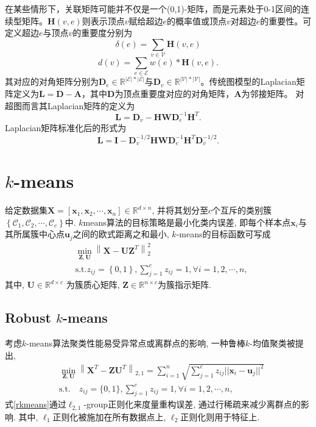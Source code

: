 \documentclass[lang=cn,10pt]{gorgeousnbook}
\numberwithin{equation}{section}%
\numberwithin{figure}{section}%
\begin{document}
在某些情形下，关联矩阵可能并不仅是一个(0,1)-矩阵，而是元素处于0-1区间的连续型矩阵。$\mathbf{H}(v,e)$则表示顶点$v$赋给超边$e$的概率值或顶点$v$对超边$e$的重要性。可定义超边$e$与顶点$v$的重要度分别为
\begin{equation}
\delta(e)=\sum_{v\in\mathcal{V}}\mathbf{H}(v,e)
\end{equation}
\begin{equation}
d(v)=\sum_{e\in\mathcal{E}}w(e)*\mathbf{H}(v,e).
\end{equation}
其对应的对角矩阵分别为$\mathbf{D}_e\in\mathbb{R}^{|\mathcal{E}|*|\mathcal{E}|}$与$\mathbf{D}_v\in\mathbb{R}^{|\mathcal{V}|*|\mathcal{V}|}$。传统图模型的Laplacian矩阵定义为$\mathbf{L} = \mathbf{D}-\mathbf{A}$，其中$\mathbf{D}$为顶点重要度对应的对角矩阵，$\mathbf{A}$为邻接矩阵。
对超图而言其Laplacian矩阵的定义为
\begin{equation}
\mathbf{L}=\mathbf{D}_v-\mathbf{H}\mathbf{W}\mathbf{D}_e^{-1}\mathbf{H}^T.
\end{equation}
Laplacian矩阵标准化后的形式为
\begin{equation}
\mathbf{L}=\mathbf{I}-\mathbf{D}_v^{-1/2}\mathbf{H}\mathbf{W}\mathbf{D}_e^{-1}\mathbf{H}^T\mathbf{D}_v^{-1/2}.
\end{equation}




\section{$k$-means}
给定数据集$\bm{X} = [\bm{x}_1,\bm{x}_2,\cdots,\bm{x}_n]\in\mathbb{R}^{d\times n}$, 并将其划分至$c$个互斥的类别簇$\left\{\mathcal{C}_1,\mathcal{C}_2,\cdots,\mathcal{C}_c\right\}$中. $k$means算法的目标策略是最小化类内误差, 即每个样本点$\bm{x}_i$与其所属簇中心点$\bm{u}_j$之间的欧式距离之和最小, $k$-means的目标函数可写成
\begin{equation}
\begin{aligned}
&\min_{\boldsymbol{Z},\boldsymbol{U}} \left\| \boldsymbol{X}-\boldsymbol{UZ}^T \right\| _{2}^{2}\\
&\mathrm{s}.\mathrm{t}. z_{ij}=\left\{ 0,1 \right\} ,\sum_{j=1}^c{z_{ij}=1,\forall i=1,2,\cdots ,n,}
\end{aligned}
\end{equation}
其中, $\bm{U}\in\mathbb{R}^{d\times c}$ 为簇质心矩阵, $\bm{Z}\in\mathbb{R}^{n\times c}$为簇指示矩阵. 
\subsection{Robust $k$-means}
考虑$k$-means算法聚类性能易受异常点或离群点的影响, 一种鲁棒$k$-均值聚类被提出,
\begin{equation}
\begin{aligned}
&\min_{\bm{Z},\bm{U}}\left\|\bm{X}^T-\bm{ZU}^T\right\|_{2,1}=\sum_{i=1}^n\sqrt{\sum_{j=1}^cz_{ij}||\boldsymbol{x}_i-\boldsymbol{u}_j||^2}\\
&\text{s.t.}\quad z_{ij}=\{0,1\},\sum_{j=1}^cz_{ij}=1,\forall i=1,2,\cdots,n,
\end{aligned}\label{rkmeans}
\end{equation}
式\eqref{rkmeans}通过$\ell_{2,1}$-group正则化来度量重构误差, 通过行稀疏来减少离群点的影响. 其中, $\ell_1$正则化被施加在所有数据点上, $\ell_2$正则化则用于特征上. 
\end{document}

